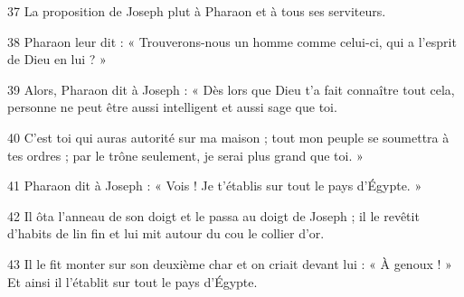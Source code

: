 37 La proposition de Joseph plut à Pharaon et à tous ses serviteurs.

38 Pharaon leur dit : « Trouverons-nous un homme comme celui-ci, qui a l’esprit de Dieu en lui ? »

39 Alors, Pharaon dit à Joseph : « Dès lors que Dieu t’a fait connaître tout cela, personne ne peut être aussi intelligent et aussi sage que toi.

40 C’est toi qui auras autorité sur ma maison ; tout mon peuple se soumettra à tes ordres ; par le trône seulement, je serai plus grand que toi. »

41 Pharaon dit à Joseph : « Vois ! Je t’établis sur tout le pays d’Égypte. »

42 Il ôta l’anneau de son doigt et le passa au doigt de Joseph ; il le revêtit d’habits de lin fin et lui mit autour du cou le collier d’or.

43 Il le fit monter sur son deuxième char et on criait devant lui : « À genoux ! » Et ainsi il l’établit sur tout le pays d’Égypte.